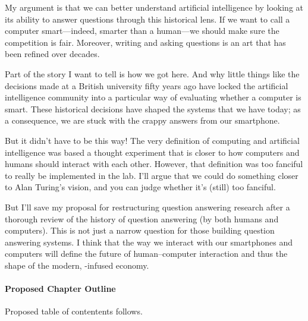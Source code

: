 My argument is that we can better understand artificial intelligence by
looking at its ability to answer questions through this historical lens.
%
If we want to call a computer smart---indeed, smarter than a human---we should
make sure the competition is fair.
%
Moreover, writing and asking questions is an art that has been refined over
decades.

Part of the story I want to tell is how we got here.
%
And why little things like the decisions made at a British university
fifty years ago have locked the artificial intelligence community into
a particular way of evaluating whether a computer is smart.
%
These historical decisions have shaped the systems that we have today;
as a consequence, we are stuck with the crappy answers from our
smartphone.

But it didn't have to be this way!
%
The very definition of computing and artificial intelligence was based a
thought experiment that is closer to how computers and humans should interact
with each other.
%
However, that definition was too fanciful to really be implemented in
the lab.
%
I'll argue that we could do something closer to Alan Turing's vision,
and you can judge whether it's (still) too fanciful.

But I'll save my proposal for restructuring question answering
research after a thorough review of the history of question answering
(by both humans and computers).
%
This is not just a narrow question for those building question
answering systems.
%
I think that the way we interact with our smartphones and computers
will define the future of human--computer interaction and
thus the shape of the modern, -infused economy.

\paragraph{Proposed Chapter Outline}

Proposed table of contentents follows.

